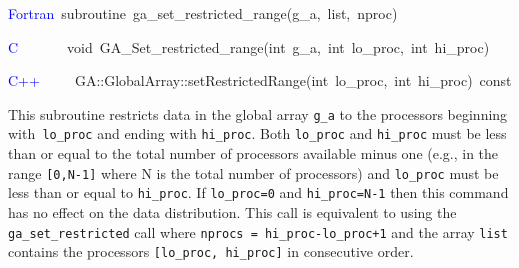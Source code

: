 \textcolor{blue}{Fortran}~subroutine~ga\_set\_restricted\_range(g\_a,~list,~nproc)~

\textcolor{blue}{C}~~~~~~~void~GA\_Set\_restricted\_range(int~g\_a,~int~lo\_proc,~int~hi\_proc)~

\textcolor{blue}{C++~}~~~~GA::GlobalArray::setRestrictedRange(int~lo\_proc,~int~hi\_proc)~const

This subroutine restricts data in the global array \texttt{g\_a} to
the processors beginning with\texttt{ lo\_proc} and ending with \texttt{hi\_proc}.
Both \texttt{lo\_proc} and \texttt{hi\_proc} must be less than or
equal to the total number of processors available minus one (e.g.,
in the range \texttt{{[}0,N-1{]}} where N is the total number of processors)
and \texttt{lo\_proc} must be less than or equal to \texttt{hi\_proc}.
If \texttt{lo\_proc=0} and \texttt{hi\_proc=N-1} then this command
has no effect on the data distribution. This call is equivalent to
using the \texttt{ga\_set\_restricted} call where \texttt{nprocs =
hi\_proc-lo\_proc+1} and the array \texttt{list} contains the processors
\texttt{{[}lo\_proc, hi\_proc{]}} in consecutive order. 
